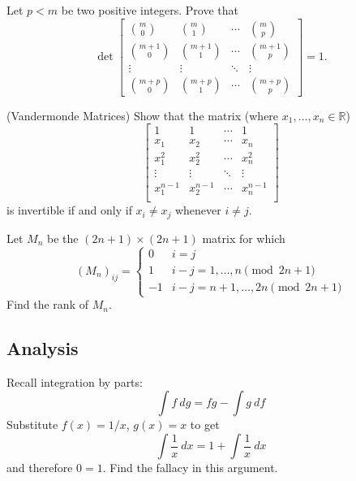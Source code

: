 \documentclass[12pt]{article}
\begin{document}
            \begin{exercise}
            Let $p < m$ be two positive integers. Prove that 
            \[\det \begin{bmatrix}
            \binom{m}{0}&\binom{m}{1}&\cdots&\binom{m}{p}\\
            \binom{m + 1}{0}&\binom{m + 1}{1}&\cdots&\binom{m + 1}{p}\\
            \vdots&\vdots&\ddots&\vdots\\
            \binom{m + p}{0}&\binom{m + p}{1}&\cdots&\binom{m + p}{p} 
            \end{bmatrix} = 1.
            \]
            \end{exercise}
            
            \begin{exercise}
            (Vandermonde Matrices) Show that the matrix (where $x_{1}, \ldots, x_{n} \in \mathbb{R}$)
            \[\begin{bmatrix}
            1&1&\cdots&1\\
            x_{1}&x_{2}&\cdots&x_{n}\\
            x_{1}^{2}&x_{2}^{2}&\cdots&x_{n}^{2}\\
            \vdots&\vdots&\ddots&\vdots\\
            x_{1}^{n - 1}&x_{2}^{n - 1}&\cdots&x_{n}^{n - 1}\\
            \end{bmatrix}
            \]
            is invertible if and only if $x_{i} \neq x_{j}$ whenever $i \neq j$. 
            \end{exercise}

            \begin{exercise}
                Let $M_n$ be the $(2n+1)\times (2n+1)$ matrix for which \[(M_n)_{ij}=\begin{cases} 0 & i=j \\
                1 & i-j=1,\dots,n \pmod{2n+1} \\ -1 & i-j=n+1,\dots,2n \pmod{2n+1}\end{cases}\] Find the rank of $M_n$.
            \end{exercise}

    \subsection{Analysis}

        \begin{exercise}
            Recall integration by parts:
            \[ \int f\ dg = fg- \int g\ df\] Substitute $f(x)=1/x$, $g(x)=x$ to get
            \[\int \frac{1}{x}\ dx = 1+ \int \frac{1}{x}\ dx\] and therefore $0=1$. Find the fallacy in this argument.
        \end{exercise}
\end{document}
